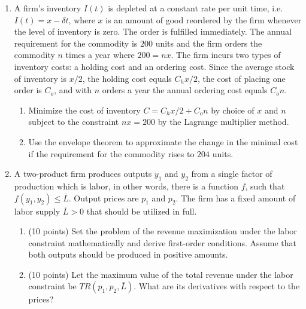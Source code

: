 \documentclass[12pt]{article} %
\theoremstyle{definition} %
\begin{document}
\begin{enumerate}[resume]
\item A firm’s inventory $I(t)$ is depleted at a constant rate per unit time, i.e. $I(t) = x-\delta t$, where $x$ is an amount of good reordered by the firm whenever the level of inventory is
zero. The order is fulfilled immediately. The annual requirement for the commodity is
$200$ units and the firm orders the commodity $n$ times a year where $200 = nx$. The firm
incurs two types of inventory costs: a holding cost and an ordering cost. Since the average
stock of inventory is $x/2$, the holding cost equals $C_h x/2$, the cost of placing one order is
$C_o$, and with $n$ orders a year the annual ordering cost equals $C_o n$.
\begin{enumerate}
\item Minimize the cost of inventory $C = C_h x/2 + C_o n$ by choice of $x$ and $n$ subject to
the constraint $nx = 200$ by the Lagrange multiplier method.
\item Use the envelope theorem to approximate the change in the minimal cost if the
requirement for the commodity rises to $204$ units.
\end{enumerate}


\item A two-product firm produces outputs $y_1$ and $y_2$ from a single factor of production which is labor, in other words, there is a function $f$, such that $f(y_1,y_2)\leq \bar{L}$. Output prices are $p_1$ and $p_2$. The firm has a fixed amount of labor supply $\bar{L}>0$ that should be utilized in full.
\begin{enumerate}
\item (10 points) Set the problem of the revenue maximization under the labor constraint mathematically and derive first-order conditions. Assume that both outputs should be produced in positive amounts.
\item (10 points) Let the maximum value of the total revenue under the labor constraint be $TR(p_1,p_2,\bar{L})$. What are its derivatives with respect to the prices?
\end{enumerate}


\end{enumerate}
\end{document}
